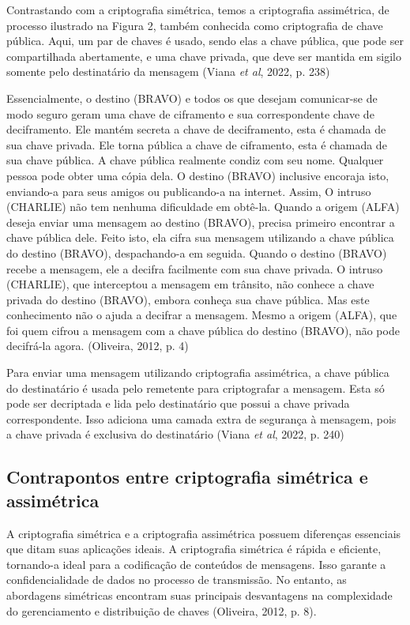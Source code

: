 Contrastando com a criptografia simétrica, temos a criptografia assimétrica, de
processo ilustrado na Figura 2, também conhecida como criptografia de chave
pública. Aqui, um par de chaves é usado, sendo elas a chave pública, que pode
ser compartilhada abertamente, e uma chave privada, que deve ser mantida em
sigilo somente pelo destinatário da mensagem (Viana \textit{et al}, 2022, p.
238)

\begin{CitacaoLonga}
	Essencialmente, o destino (BRAVO) e todos os que desejam comunicar-se de modo
	seguro geram uma chave de ciframento e sua correspondente chave de
	deciframento. Ele mantém secreta a chave de deciframento, esta é chamada de sua
	chave privada. Ele torna pública a chave de ciframento, esta é chamada de sua
	chave pública. A chave pública realmente condiz com seu nome. Qualquer pessoa
	pode obter uma cópia dela. O destino (BRAVO) inclusive encoraja isto,
	enviando-a para seus amigos ou publicando-a na internet. Assim, O intruso
	(CHARLIE) não tem nenhuma dificuldade em obtê-la. Quando a origem (ALFA) deseja
	enviar uma mensagem ao destino (BRAVO), precisa primeiro encontrar a chave
	pública dele. Feito isto, ela cifra sua mensagem utilizando a chave pública do
	destino (BRAVO), despachando-a em seguida. Quando o destino (BRAVO) recebe a
	mensagem, ele a decifra facilmente com sua chave privada. O intruso (CHARLIE),
	que interceptou a mensagem em trânsito, não conhece a chave privada do destino
	(BRAVO), embora conheça sua chave pública. Mas este conhecimento não o ajuda a
	decifrar a mensagem. Mesmo a origem (ALFA), que foi quem cifrou a mensagem com
	a chave pública do destino (BRAVO), não pode decifrá-la agora. (Oliveira, 2012,
	p. 4)
\end{CitacaoLonga}

Para enviar uma mensagem utilizando criptografia assimétrica, a chave pública
do destinatário é usada pelo remetente para criptografar a mensagem. Esta só
pode ser decriptada e lida pelo destinatário que possui a chave privada
correspondente. Isso adiciona uma camada extra de segurança à mensagem, pois a
chave privada é exclusiva do destinatário (Viana \textit{et al}, 2022, p. 240)

\subsection{Contrapontos entre criptografia simétrica e assimétrica}

A criptografia simétrica e a criptografia assimétrica possuem diferenças
essenciais que ditam suas aplicações ideais. A criptografia simétrica é rápida
e eficiente, tornando-a ideal para a codificação de conteúdos de mensagens.
Isso garante a confidencialidade de dados no processo de transmissão. No
entanto, as abordagens simétricas encontram suas principais desvantagens na
complexidade do gerenciamento e distribuição de chaves (Oliveira, 2012, p. 8).

